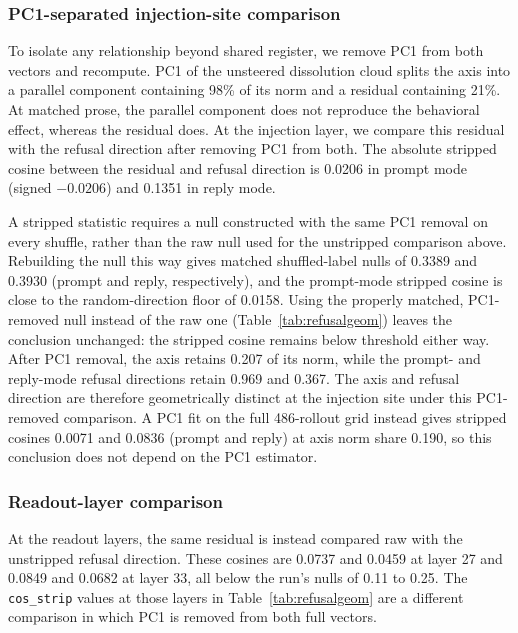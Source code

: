 \subsubsection{PC1-separated injection-site comparison}

To isolate any relationship beyond shared register, we remove PC1 from both
vectors and recompute. PC1 of the unsteered dissolution cloud splits the axis
into a parallel component containing 98\% of its norm and a residual
containing 21\%. At matched prose, the parallel component does not reproduce
the behavioral effect, whereas the residual does. At the injection layer, we
compare this residual with the refusal direction after removing PC1 from
both. The absolute stripped cosine between the residual and refusal direction
is 0.0206 in prompt mode (signed $-0.0206$) and 0.1351 in reply mode.

A stripped statistic requires a null constructed with the same PC1 removal on
every shuffle, rather than the raw null used for the unstripped comparison
above. Rebuilding the null this way gives matched shuffled-label nulls of
0.3389 and 0.3930 (prompt and reply, respectively), and the prompt-mode
stripped cosine is close to the random-direction floor of 0.0158. Using the
properly matched, PC1-removed null instead of the raw one
(Table~\ref{tab:refusalgeom}) leaves the conclusion unchanged: the stripped
cosine remains below threshold either way. After PC1 removal, the axis
retains 0.207 of its norm, while the prompt- and reply-mode refusal
directions retain 0.969 and 0.367. The axis and refusal direction are therefore
geometrically distinct at the injection site under this PC1-removed comparison.
A PC1 fit on the full 486-rollout grid instead gives stripped cosines 0.0071
and 0.0836 (prompt and reply) at axis norm share 0.190, so this conclusion does
not depend on the PC1 estimator.

\subsubsection{Readout-layer comparison}

At the readout layers, the same residual is instead compared raw with the
unstripped refusal direction. These cosines are 0.0737 and 0.0459 at layer 27
and 0.0849 and 0.0682 at layer 33, all below the run's nulls of 0.11 to 0.25.
The \texttt{cos\_strip} values at those layers in Table~\ref{tab:refusalgeom}
are a different comparison in which PC1 is removed from both full vectors.

